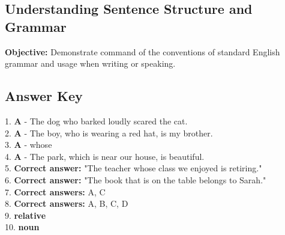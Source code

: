 \documentclass[12pt]{article}
\begin{document}
\subsection*{Understanding Sentence Structure and Grammar}
\onehalfspacing

\begin{tcolorbox}[colframe=black!40, colback=gray!0, title=Learning Objective]
\textbf{Objective:} Demonstrate command of the conventions of standard English grammar and usage when writing or speaking.
\end{tcolorbox}


\subsection*{Answer Key}

1. \textbf{A} - The dog who barked loudly scared the cat. \\
2. \textbf{A} - The boy, who is wearing a red hat, is my brother. \\
3. \textbf{A} - whose \\
4. \textbf{A} - The park, which is near our house, is beautiful. \\
5. \textbf{Correct answer:} "The teacher whose class we enjoyed is retiring." \\
6. \textbf{Correct answer:} "The book that is on the table belongs to Sarah." \\
7. \textbf{Correct answers:} A, C \\
8. \textbf{Correct answers:} A, B, C, D \\
9. \textbf{relative} \\
10. \textbf{noun} \\
\end{document}
